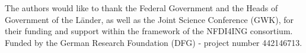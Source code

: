 The authors would like to thank the Federal Government and the Heads of Government of the Länder, as well as the Joint Science Conference (GWK), for their funding and support within the framework of the NFDI4ING consortium. Funded by the German Research Foundation (DFG) - project number 442146713.
